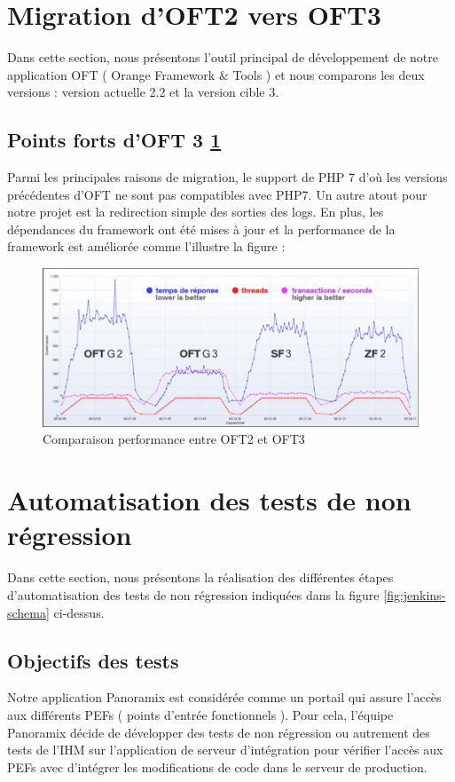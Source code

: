 \section{Migration d’OFT2 vers OFT3}
Dans cette section, nous présentons l’outil principal de développement de notre application OFT ( Orange Framework \& Tools ) et nous comparons les deux versions : version actuelle 2.2 et la version cible 3.
\subsection{Points forts d’OFT 3 \ref{fig:oft-3}}
Parmi les principales raisons de migration, le support de PHP 7 d’où les versions précédentes  d’OFT ne sont pas compatibles avec PHP7. Un autre atout pour notre projet est la redirection simple des sorties des logs. En plus, les dépendances du framework ont été mises à jour et la performance de la framework est améliorée comme l'illustre la figure  :
\begin{figure}[H]
	\centering
	\includegraphics[width=0.7\linewidth]{img/oft-3}
	\caption[Comparaison performance entre OFT2 et OFT3]{Comparaison performance entre OFT2 et OFT3\cite{oft-doc}}
	\label{fig:oft-3}
\end{figure}
\section[Automatisation des tests de non régression]{Automatisation des tests de non régression}
Dans cette section, nous présentons la réalisation des différentes étapes d’automatisation des tests de non régression indiquées dans la figure \ref{fig:jenkins-schema} ci-dessus.
\subsection{Objectifs des tests}
Notre application Panoramix est considérée comme un portail qui assure l’accès aux différents PEFs ( points d’entrée fonctionnels ). Pour cela, l’équipe Panoramix décide de développer des  tests de non régression ou autrement des tests de l’IHM sur l’application de serveur d'intégration pour vérifier l’accès aux PEFs avec d’intégrer les modifications de code dans le serveur de production.
